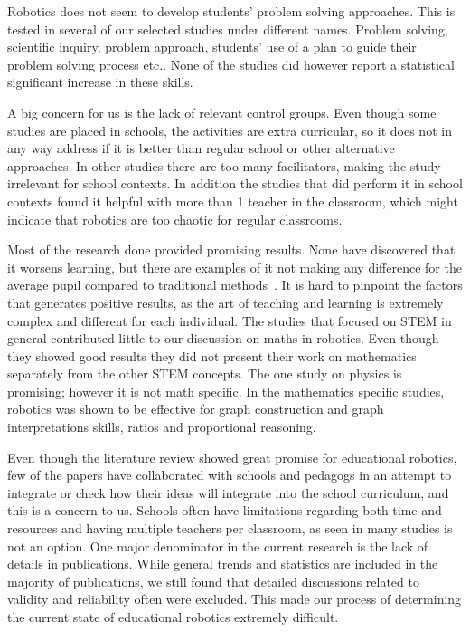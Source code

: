 \bigskip\noindent
Robotics does not seem to develop students' problem solving approaches. This is tested in several of our selected studies under different names. Problem solving, scientific inquiry, problem approach, students' use of a plan to guide their problem solving process etc.. None of the studies did however report a statistical significant increase in these skills. 

\bigskip\noindent
A big concern for us is the lack of relevant control groups. Even though some studies are placed in schools, the activities are extra curricular, so it does not in any way address if it is better than regular school or other alternative approaches. In other studies there are too many facilitators, making the study irrelevant for school contexts. In addition the studies that did perform it in school contexts found it helpful with more than 1 teacher in the classroom, which might indicate that robotics are too chaotic for regular classrooms. 

\bigskip\noindent
Most of the research done provided promising results. None have discovered that it worsens learning, but there are examples of it not making any difference for the average pupil compared to traditional methods~\cite{lindh2007does}. It is hard to pinpoint the factors that generates positive results, as the art of teaching and learning is extremely complex and different for each individual. The studies that focused on STEM in general contributed little to our discussion on maths in robotics. Even though they showed good results they did not present their work on mathematics separately from the other STEM concepts. The one study on physics is promising; however it is not math specific. In the mathematics specific studies, robotics was shown to be effective for graph construction and graph interpretations skills, ratios and proportional reasoning. 

\bigskip\noindent
Even though the literature review showed great promise for educational robotics, few of the papers have collaborated with schools and pedagogs in an attempt to integrate or check how their ideas will integrate into the school curriculum, and this is a concern to us. Schools often have limitations regarding both time and resources and having multiple teachers per classroom, as seen in many studies is not an option.
One major denominator in the current research is the lack of details in publications. While general trends and statistics are included in the majority of publications, we still found that detailed discussions related to validity and reliability often were excluded. This made our process of determining the current state of educational robotics extremely difficult. 


